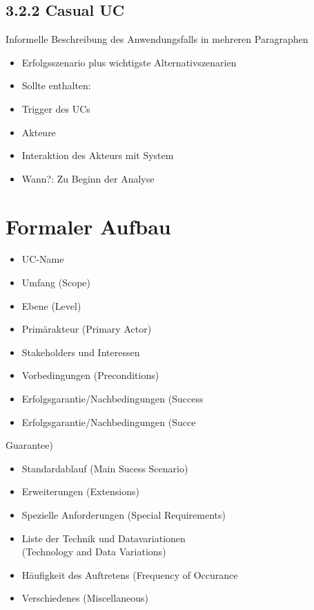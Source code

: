 \documentclass[10pt]{article}
\begin{document}
\subsection*{3.2.2 Casual UC}
Informelle Beschreibung des Anwendungsfalls in mehreren Paragraphen

\begin{itemize}
  \item Erfolgsszenario plus wichtigste Alternativszenarien
  \item Sollte enthalten:
  \item Trigger des UCs
  \item Akteure
  \item Interaktion des Akteurs mit System
  \item Wann?: Zu Beginn der Analyse
\end{itemize}

\section*{Formaler Aufbau}
\begin{itemize}
  \item UC-Name
  \item Umfang (Scope)
  \item Ebene (Level)
  \item Primärakteur (Primary Actor)
  \item Stakeholders und Interessen
  \item Vorbedingungen (Preconditions)
  \item Erfolgsgarantie/Nachbedingungen (Success
  \item Erfolgsgarantie/Nachbedingungen (Succe
\end{itemize}

Guarantee)

\begin{itemize}
  \item Standardablauf (Main Sucess Scenario)
  \item Erweiterungen (Extensions)
  \item Spezielle Anforderungen (Special Requirements)
  \item Liste der Technik und Datavariationen\\
(Technology and Data Variations)
  \item Häufigkeit des Auftretens (Frequency of Occurance
  \item Verschiedenes (Miscellaneous)
\end{itemize}
\end{document}
